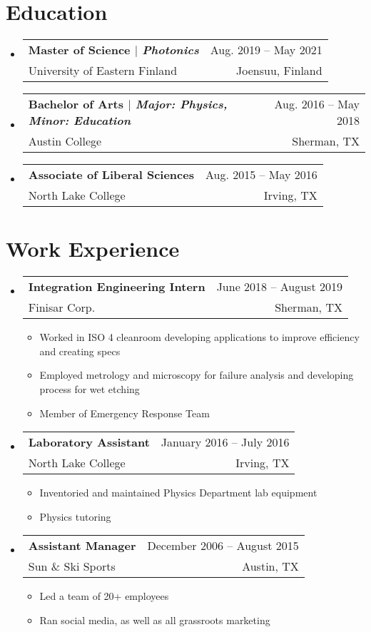 \documentclass[letterpaper,11pt]{article} %
\makeatletter
\newcommand{\CVItem}[1]{
  \item\small{
    {#1 \vspace{-2pt}}
  }
}
\newcommand{\CVSubheading}[4]{
  \vspace{-2pt}\item
    \begin{tabular*}{0.97\textwidth}[t]{l@{\extracolsep{\fill}}r}
      \textbf{#1} & #2 \\
      \small#3 & \small #4 \\
    \end{tabular*}\vspace{-7pt}
}
\newcommand{\CVSubHeadingListStart}{\begin{itemize}[leftmargin=0.5cm, label={}]}
\newcommand{\CVSubHeadingListEnd}{\end{itemize}}
\newcommand{\CVItemListStart}{\begin{itemize}}
\newcommand{\CVItemListEnd}{\end{itemize}\vspace{-5pt}}
\makeatother
\begin{document}
\section{Education}
\CVSubHeadingListStart
\CVSubheading
{{Master of Science $|$ \emph{\small{Photonics}}}}{Aug. 2019 -- May 2021}
{University of Eastern Finland}{Joensuu, Finland}
\CVSubheading
{{Bachelor of Arts $|$ \emph{\small{Major: Physics, Minor: Education}}}}{Aug. 2016 -- May 2018}
{Austin College}{Sherman, TX}
\CVSubheading
{Associate of Liberal Sciences}{Aug. 2015 -- May 2016}
{North Lake College}{Irving, TX}
\CVSubHeadingListEnd

\begin{comment}
try to briefly explain what you did and why it is relevant to the position you
are seeking
\end{comment}

\section{Work Experience}
\CVSubHeadingListStart
\CVSubheading
{Integration Engineering Intern}{June 2018 -- August 2019}
{Finisar Corp.}{Sherman, TX}
\CVItemListStart
\CVItem{Worked in ISO 4 cleanroom developing applications to improve efficiency and creating specs}
\CVItem{Employed metrology and microscopy for failure analysis and developing process for wet etching}
\CVItem{Member of Emergency Response Team}
\CVItemListEnd
\CVSubheading
{Laboratory Assistant}{January 2016 -- July 2016}
{North Lake College}{Irving, TX}
\CVItemListStart
\CVItem{Inventoried and maintained Physics Department lab equipment}
\CVItem{Physics tutoring}
\CVItemListEnd
\CVSubheading
{Assistant Manager}{December 2006 -- August 2015}
{Sun \& Ski Sports}{Austin, TX}
\CVItemListStart
\CVItem{Led a team of 20+ employees}
\CVItem{Ran social media, as well as all grassroots marketing}
\CVItemListEnd
\CVSubHeadingListEnd

\begin{comment}
Ideally the title of the work should speak for what it is. However if you feel
like you should explain more about why the project is applicable to this job,
use item list as is shown in the work experience section.
\end{comment}
\end{document}
